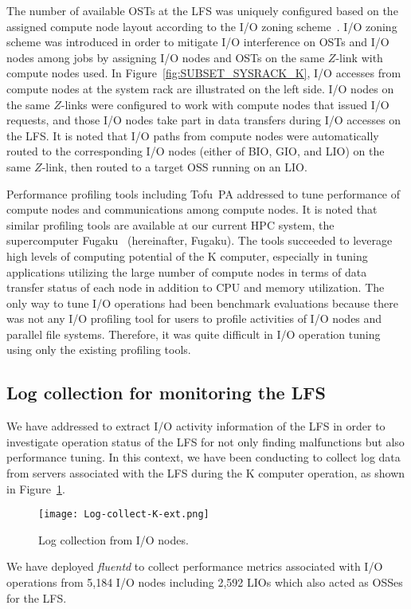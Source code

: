 \documentclass{jhps}
\begin{document}
The number of available OSTs at the LFS was uniquely configured
based on the assigned compute node layout according to
the I/O zoning scheme~\cite{sumimoto:LUG2011}.
I/O zoning scheme was introduced in order to mitigate I/O interference on OSTs
and I/O nodes among jobs by assigning I/O nodes and OSTs on the same $Z$-link
with compute nodes used.
In Figure~\ref{fig:SUBSET_SYSRACK_K}, I/O accesses from compute nodes
at the system rack are illustrated on the left side.
I/O nodes on the same $Z$-links were configured to work with compute nodes
that issued I/O requests, and those I/O nodes
take part in data transfers during I/O accesses on the LFS.
It is noted that I/O paths from compute nodes were automatically routed
to the corresponding I/O nodes (either of BIO, GIO, and LIO) on the same $Z$-link,
then routed to a target OSS running on an LIO.

Performance profiling tools including Tofu~PA addressed to tune performance of
compute nodes and communications among compute nodes.
It is noted that similar profiling tools are available at
our current HPC system, the supercomputer Fugaku~\cite{fugaku_info:web}
(hereinafter, Fugaku).
The tools succeeded to leverage high levels of computing potential of the K computer,
especially in tuning applications utilizing the large number of compute nodes
in terms of data transfer status of each node in addition to CPU and memory utilization.
The only way to tune I/O operations had been benchmark evaluations
because there was not any I/O profiling tool for users to profile activities
of I/O nodes and parallel file systems.
Therefore, it was quite difficult in I/O operation tuning
using only the existing profiling tools.

\subsection{Log collection for monitoring the LFS}
\label{ssec:LOG_COLL_MON}

We have addressed to extract I/O activity information of the LFS
in order to investigate operation status of the LFS
for not only finding malfunctions but also performance tuning.
In this context, we have been conducting to collect log data from servers
associated with the LFS during the K computer operation,
as shown in Figure~\ref{fig:Log-collect-K}.
%
\begin{figure}[tb]
\centering
\texttt{[image: Log-collect-K-ext.png]}
\caption{Log collection from I/O nodes.}
\label{fig:Log-collect-K}
\end{figure}
We have deployed {\itshape fluentd} to collect performance metrics associated with
I/O operations from 5,184 I/O nodes including 2,592 LIOs which also acted as OSSes
for the LFS.
\end{document}

